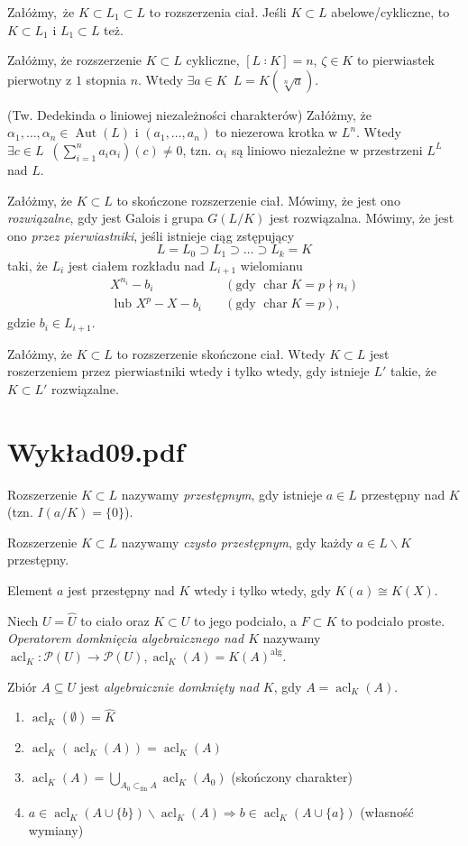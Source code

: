\documentclass[a4paper, 12pt]{article}
\DeclareMathOperator{\Char}{char}
\DeclareMathOperator{\alg}{alg}
\DeclareMathOperator{\acl}{acl}
\DeclareMathOperator{\Aut}{Aut}
\newcommand{\+}{\enspace}
\begin{document}
Załóżmy, że $K ⊂ L_1 ⊂ L$ to rozszerzenia ciał.
Jeśli $K⊂L$ abelowe/cykliczne, to $K⊂L_1$ i $L_1⊂L$ też.

Załóżmy, że rozszerzenie $K⊂L$ cykliczne,
$[L∶K]=n$, $ζ∈K$ to pierwiastek pierwotny z $1$ stopnia $n$.
Wtedy $∃a∈K\+ L=K(\sqrt[n]{a})$.

(Tw. Dedekinda o liniowej niezależności charakterów)
Załóżmy, że $α_1,…,α_n ∈ \Aut(L)$ i $(a_1,…,a_n)$
to niezerowa krotka w $L^n$.
Wtedy $∃c ∈ L\+ (∑_{i=1}^n a_i α_i)(c) ≠ 0$,
tzn. $α_i$ są liniowo niezależne w przestrzeni $L^L$ nad $L$.

Załóżmy, że $K⊂L$ to skończone rozszerzenie ciał.
Mówimy, że jest ono \textit{rozwiązalne},
gdy jest Galois i grupa $G(L/K)$ jest rozwiązalna.
Mówimy, że jest ono \textit{przez pierwiastniki}, jeśli
istnieje ciąg zstępujący
$$L=L_0 ⊃ L_1 ⊃ … ⊃ L_k = K$$
taki, że $L_i$ jest ciałem rozkładu nad $L_{i+1}$
wielomianu
\begin{align*}
	X^{n_i}-b_i & \quad (\text{gdy }\Char K = p \nmid n_i)\\
	\text{ lub }X^p-X-b_i & \quad (\text{gdy }\Char K = p),
\end{align*}
gdzie $b_i ∈ L_{i+1}$.

Załóżmy, że $K⊂L$ to rozszerzenie skończone ciał.
Wtedy $K⊂L$ jest roszerzeniem przez pierwiastniki wtedy i tylko wtedy,
gdy istnieje $L'$ takie, że $K ⊂ L'$ rozwiązalne.

\section*{Wykład09.pdf}
Rozszerzenie $K⊂L$ nazywamy \textit{przestępnym}, gdy
istnieje $a∈L$ przestępny nad $K$ (tzn. $I(a/K) = \{ 0 \}$).

Rozszerzenie $K⊂L$ nazywamy \textit{czysto przestępnym}, gdy
każdy $a∈L∖K$ przestępny.

Element $a$ jest przestępny nad $K$ wtedy i tylko wtedy, gdy
$K(a) ≅ K(X)$.

Niech $U = \hat{U}$ to ciało oraz $K ⊂ U$ to jego podciało,
a $F ⊂ K$ to podciało proste.
\textit{Operatorem domknięcia algebraicznego nad $K$} nazywamy
$\acl_K: \mathcal{P}(U) → \mathcal{P}(U), \acl_K(A) = K(A)^{\alg}$.

Zbiór $A ⊆ U$ jest \textit{algebraicznie domknięty nad $K$}, gdy $A = \acl_K(A)$.

\begin{enumerate}
	\item $\acl_K(∅) = \hat{K}$
	\item $\acl_K(\acl_K(A)) = \acl_K(A)$
	\item $\acl_K(A) = \bigcup_{A_0 ⊂_{\mathrm{fin}} A} \acl_K(A_0)$
		(skończony charakter)
	\item $a ∈ \acl_K(A∪\{b\})∖\acl_K(A) ⇒ b ∈ \acl_K(A∪\{a\})$
		(własność wymiany)
\end{enumerate}
\end{document}
